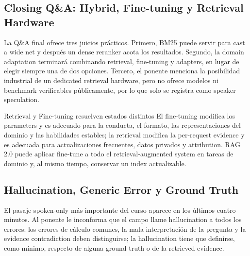 
\subsection{Closing Q\&A: Hybrid, Fine-tuning y Retrieval Hardware}

La Q\&A final ofrece tres juicios prácticos. Primero, BM25 puede servir para cast a wide net y después un dense reranker acota los resultados. Segundo, la domain adaptation terminará combinando retrieval, fine-tuning y adapters, en lugar de elegir siempre una de dos opciones. Tercero, el ponente menciona la posibilidad industrial de un dedicated retrieval hardware, pero no ofrece modelos ni benchmark verificables públicamente, por lo que solo se registra como speaker speculation.

\begin{knowledgebox}{Retrieval y Fine-tuning resuelven estados distintos}
El fine-tuning modifica los parameters y es adecuado para la conducta, el formato, las representaciones del dominio y las habilidades estables; la retrieval modifica la per-request evidence y es adecuada para actualizaciones frecuentes, datos privados y attribution. RAG 2.0 puede aplicar fine-tune a todo el retrieval-augmented system en tareas de dominio y, al mismo tiempo, conservar un index actualizable.
\end{knowledgebox}


\subsection{Hallucination, Generic Error y Ground Truth}

El pasaje spoken-only más importante del curso aparece en los últimos cuatro minutos. Al ponente le inconforma que el campo llame hallucination a todos los errores: los errores de cálculo comunes, la mala interpretación de la pregunta y la evidence contradiction deben distinguirse; la hallucination tiene que definirse, como mínimo, respecto de alguna ground truth o de la retrieved evidence.

